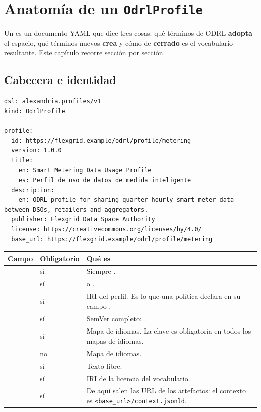 \chapter{Anatomía de un \texttt{OdrlProfile}}
\label{ch:odrlprofile}

Un  es un documento YAML que dice tres cosas: qué términos de ODRL \textbf{adopta} el espacio,
qué términos nuevos \textbf{crea} y cómo de \textbf{cerrado} es el vocabulario resultante. Este capítulo recorre
 sección por sección.

\section{Cabecera e identidad}

\begin{lstlisting}[style=yaml]
dsl: alexandria.profiles/v1
kind: OdrlProfile

profile:
  id: https://flexgrid.example/odrl/profile/metering
  version: 1.0.0
  title:
    en: Smart Metering Data Usage Profile
    es: Perfil de uso de datos de medida inteligente
  description:
    en: ODRL profile for sharing quarter-hourly smart meter data between DSOs, retailers and aggregators.
  publisher: Flexgrid Data Space Authority
  license: https://creativecommons.org/licenses/by/4.0/
  base_url: https://flexgrid.example/odrl/profile/metering
\end{lstlisting}

\noindent\begin{tabularx}{\linewidth}{@{}L{3.7cm}L{2.2cm}Y@{}}
\toprule
\textbf{Campo} & \textbf{Obligatorio} & \textbf{Qué es} \\
\midrule
{} & sí & Siempre . \\
 & sí &  o . \\
 & sí & IRI del perfil. Es lo que una política declara en su campo . \\
 & sí & SemVer completo: . \\
 & sí & Mapa de idiomas. La clave  es obligatoria en todos los mapas de idiomas. \\
 & no & Mapa de idiomas. \\
 & sí & Texto libre. \\
 & sí & IRI de la licencia del vocabulario. \\
 & sí & De aquí salen las URL de los artefactos: el contexto es \texttt{<base\_url>/\allowbreak{}context.jsonld}. \\
\bottomrule
\end{tabularx}

